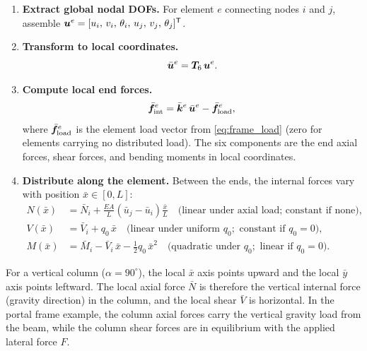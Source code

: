 \begin{enumerate}
    \item \textbf{Extract global nodal DOFs.}
          For element $e$ connecting nodes $i$ and $j$, assemble
          $\bm{u}^e = [u_i,\,v_i,\,\theta_i,\,u_j,\,v_j,\,\theta_j]^{\mathsf{T}}$.

    \item \textbf{Transform to local coordinates.}
          \[
              \bar{\bm{u}}^e = \bm{T}_6\,\bm{u}^e .
          \]

    \item \textbf{Compute local end forces.}
          \begin{equation}
              \bar{\bm{f}}^e_{\mathrm{int}}
              = \bar{\bm{k}}^e\,\bar{\bm{u}}^e
                - \bar{\bm{f}}^e_{\mathrm{load}} ,
              \label{eq:frame_int_forces}
          \end{equation}
          where $\bar{\bm{f}}^e_{\mathrm{load}}$ is the element load
          vector from \cref{eq:frame_load} (zero for elements carrying no
          distributed load). The six components are the end axial forces,
          shear forces, and bending moments in local coordinates.

    \item \textbf{Distribute along the element.}
          Between the ends, the internal forces vary with position
          $\bar{x} \in [0,L]$:
          \begin{align}
              N(\bar{x}) &= \bar{N}_i
                            + \frac{EA}{L}(\bar{u}_j - \bar{u}_i)
                              \frac{\bar{x}}{L}
                            \quad\text{(linear under axial load; constant if none)},
                            \label{eq:frame_N_dist}\\
              V(\bar{x}) &= \bar{V}_i + q_0\,\bar{x}
                            \quad\text{(linear under uniform }q_0;
                            \text{ constant if }q_0=0\text{)},
                            \label{eq:frame_V_dist}\\
              M(\bar{x}) &= \bar{M}_i - \bar{V}_i\,\bar{x}
                            - \tfrac{1}{2}q_0\,\bar{x}^2
                            \quad\text{(quadratic under }q_0;
                            \text{ linear if }q_0=0\text{)}.
                            \label{eq:frame_M_dist}
          \end{align}
\end{enumerate}

\begin{remark}
For a vertical column ($\alpha = 90^\circ$), the local $\bar{x}$ axis points
upward and the local $\bar{y}$ axis points leftward. The local axial force
$\bar{N}$ is therefore the vertical internal force (gravity direction) in
the column, and the local shear $\bar{V}$ is horizontal. In the portal
frame example, the column axial forces carry the vertical gravity load from
the beam, while the column shear forces are in equilibrium with the applied
lateral force $F$.
\end{remark}
